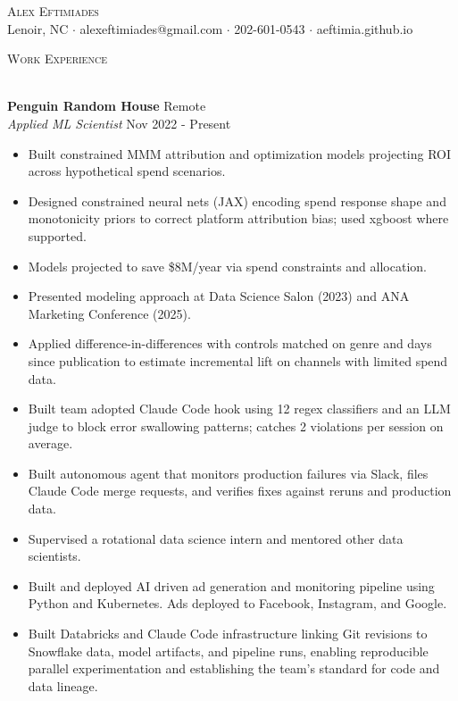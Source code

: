 \documentclass[a4paper]{article}
\newcommand{\lineunder} {
    \vspace*{-8pt} \\
    \hspace*{-18pt} \hrulefill \\
}
\newcommand{\header} [1] {
    {\hspace*{-18pt}\vspace*{6pt} \textsc{#1}}
    \vspace*{-6pt} \lineunder
}
\begin{document}
\vspace*{-40pt}

    

\vspace*{-10pt}
\begin{center}
	{\Huge \scshape {Alex Eftimiades}}\\
	Lenoir, NC $\cdot$ alexeftimiades@gmail.com $\cdot$ 202-601-0543 $\cdot$ aeftimia.github.io\\
\end{center}

\header{Work Experience}
\vspace{1mm}

\textbf{Penguin Random House} \hfill Remote\\
\textit{Applied ML Scientist} \hfill Nov 2022 - Present\\
\vspace{-1mm}
\begin{itemize} \itemsep 1pt
\item Built constrained MMM attribution and optimization models projecting ROI across hypothetical spend scenarios.
\item Designed constrained neural nets (JAX) encoding spend response shape and monotonicity priors to correct platform attribution bias; used xgboost where supported.
	\item Models projected to save \$8M/year via spend constraints and allocation.
	\item Presented modeling approach at Data Science Salon (2023) and ANA Marketing Conference (2025).
	\item Applied difference-in-differences with controls matched on genre and days since publication to estimate incremental lift on channels with limited spend data.
\item Built team adopted Claude Code hook using 12 regex classifiers and an LLM judge to block error swallowing patterns; catches 2 violations per session on average.
\item Built autonomous agent that monitors production failures via Slack, files Claude Code merge requests, and verifies fixes against reruns and production data.
	\item Supervised a rotational data science intern and mentored other data scientists.
	\item Built and deployed AI driven ad generation and monitoring pipeline using Python and Kubernetes. Ads deployed to Facebook, Instagram, and Google.
	\item Built Databricks and Claude Code infrastructure linking Git revisions to Snowflake data, model artifacts, and pipeline runs, enabling reproducible parallel experimentation and establishing the team’s standard for code and data lineage.
\end{itemize}
\end{document}
